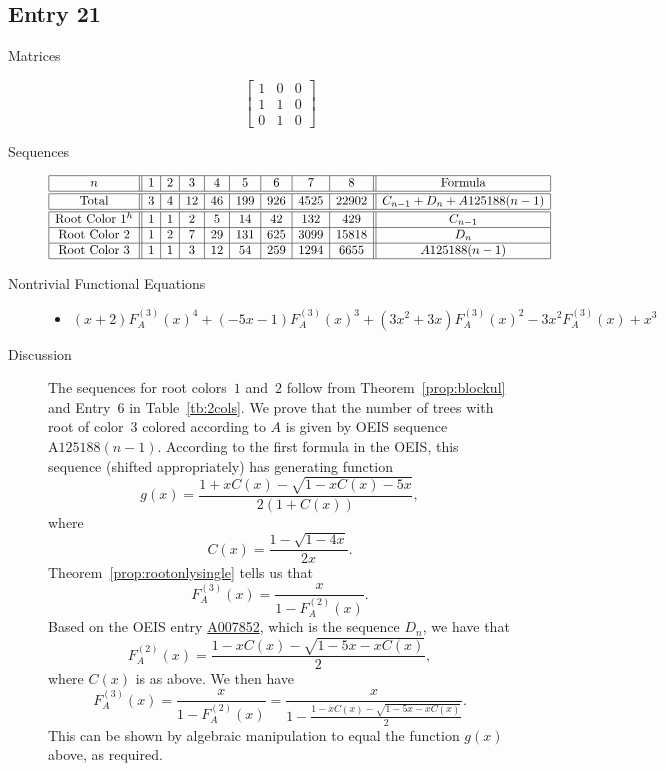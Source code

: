 \documentclass[12pt]{amsart}
\newcommand{\seqnum}[1]{\href{https://oeis.org/#1}{#1}}
\newcommand{\gff}[2]{F_{#2}^{(#1)}(x)}
\newcommand{\gfa}[1]{\gff{#1}{A}}
\begin{document}
\subsection*{Entry 21}
\begin{description}
    \item[Matrices]
    
    \[\begin{bmatrix}
1 & 0 & 0 \\
1 & 1 & 0 \\
0 & 1 & 0
\end{bmatrix}\]
    \item[Sequences]\hspace*{\fill}\vspace{-0.5cm}
    \begin{center}
        \[
        \begin{array}{|c||c|c|c|c|c|c|c|c||c|}\hline
           n  & 1 & 2 & 3 & 4 & 5 & 6 & 7 & 8  & \text{Formula}\\\hline\hline
           \text{Total}  & 3 & 4 & 12 & 46 & 199 & 926 & 4525 & 22902 & C_{n-1}+D_n+A125188(n-1)\\\hline\hline
           \text{Root Color }1^{h} & 1 & 1 & 2 & 5 & 14 & 42 & 132 & 429 & C_{n-1}\\\hline
           \text{Root Color }2 & 1 & 2 & 7 & 29 & 131 & 625 & 3099 & 15818 & D_n\\\hline
           \text{Root Color }3 & 1 & 1 & 3 & 12 & 54 & 259 & 1294 & 6655 & A125188(n-1)\\\hline
        \end{array}
        \]
    \end{center}
    
    \item[Nontrivial Functional Equations]\hspace*{\fill}

    \begin{itemize}
\item $(x + 2)\gfa{3}^4+(-5x - 1)\gfa{3}^3+(3x^2 + 3x)\gfa{3}^2-3x^2\gfa{3}+x^3$

\end{itemize}
    \item[Discussion] The sequences for root colors~$1$ and~$2$ follow from Theorem~\ref{prop:blockul} and Entry~6 in Table~\ref{tb:2cols}. We prove that the number of trees with root of color~$3$ colored according to $A$ is given by OEIS sequence $\text{A125188}(n-1)$.
    According to the first formula in the OEIS, this sequence (shifted appropriately) has generating function
\[
g(x)=\frac{1+xC(x)-\sqrt{1-xC(x)-5x}}{2\left(1+C(x)\right)},
\]
where
\[
C(x)=\frac{1-\sqrt{1-4x}}{2x}.
\]
Theorem~\ref{prop:rootonlysingle} tells us that
\[
\gfa{3}=\frac{x}{1-\gfa{2}}.
\]
Based on the OEIS entry \seqnum{A007852}, which is the sequence $D_n$, we have that \[
\gfa{2}=\frac{1-xC(x)-\sqrt{1-5x-xC(x)}}{2},
\]
where $C(x)$ is as above. We then have
\[
\gfa{3}=\frac{x}{1-\gfa{2}}=\frac{x}{1-\frac{1-xC(x)-\sqrt{1-5x-xC(x)}}{2}}.
\]
This can be shown by algebraic manipulation to equal the function $g(x)$ above, as required. 
\end{description}
\end{document}
